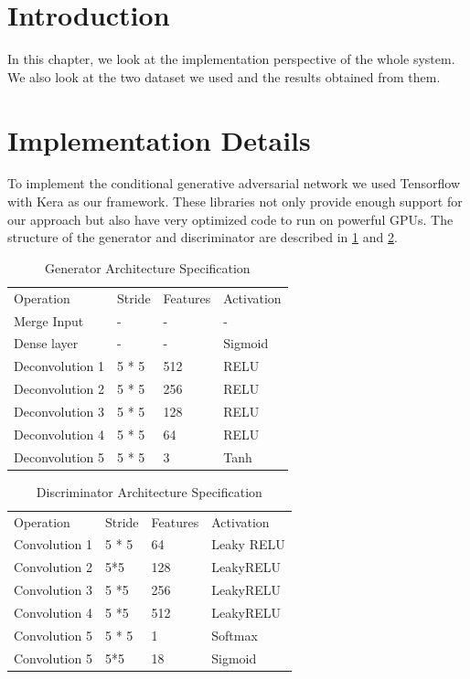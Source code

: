 \doublespacing
{}
\label{chap:EnR}

\section{Introduction}

In this chapter, we look at the implementation perspective of the whole system. We also look at the two dataset we used and the results obtained from them. 

\section{Implementation Details}
To implement the conditional generative adversarial network we used Tensorflow \cite{tensorflow2015-whitepaper} with Kera \cite{keras} as our framework. These libraries not only provide enough support for our approach but also have very optimized code to run on powerful GPUs. The structure of the generator and discriminator are described in \cref{Generator-Activation} and \cref{Discriminator-Table}.
\begin{table}[ht]
\centering
\caption{Generator Architecture Specification}
\label{Generator-Activation}
\begin{tabular}{llll}
Operation       & Stride & Features & Activation \\
Merge Input     & -      & -        & -          \\
Dense layer     & -      & -        & Sigmoid    \\
Deconvolution 1 & 5 * 5  & 512      & RELU       \\
Deconvolution 2 & 5 * 5    & 256      & RELU       \\
Deconvolution 3 & 5 * 5   & 128      & RELU       \\
Deconvolution 4 & 5 * 5   & 64       & RELU       \\
Deconvolution 5 & 5 * 5  & 3        & Tanh      
\end{tabular}
\end{table}
\begin{table}[ht]
\centering
\caption{Discriminator Architecture Specification}
\label{Discriminator-Table}
\begin{tabular}{llll}
Operation     & Stride & Features & Activation \\
Convolution 1 & 5 * 5  & 64       & Leaky RELU \\
Convolution 2 & 5*5    & 128      & LeakyRELU  \\
Convolution 3 & 5 *5   & 256      & LeakyRELU  \\
Convolution 4 & 5 *5   & 512      & LeakyRELU  \\
Convolution 5 & 5 * 5  & 1        & Softmax    \\
Convolution 5 & 5*5    & 18       & Sigmoid   
\end{tabular}
\end{table}
